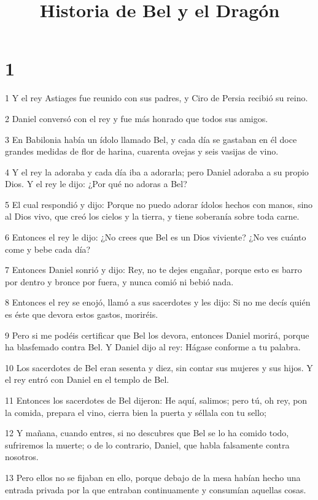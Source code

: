 

\title{Historia de Bel y el Dragón}

\chapter{1}

\par 1 Y el rey Astiages fue reunido con sus padres, y Ciro de Persia recibió su reino.
\par 2 Daniel conversó con el rey y fue más honrado que todos sus amigos.
\par 3 En Babilonia había un ídolo llamado Bel, y cada día se gastaban en él doce grandes medidas de flor de harina, cuarenta ovejas y seis vasijas de vino.
\par 4 Y el rey la adoraba y cada día iba a adorarla; pero Daniel adoraba a su propio Dios. Y el rey le dijo: ¿Por qué no adoras a Bel?
\par 5 El cual respondió y dijo: Porque no puedo adorar ídolos hechos con manos, sino al Dios vivo, que creó los cielos y la tierra, y tiene soberanía sobre toda carne.
\par 6 Entonces el rey le dijo: ¿No crees que Bel es un Dios viviente? ¿No ves cuánto come y bebe cada día?
\par 7 Entonces Daniel sonrió y dijo: Rey, no te dejes engañar, porque esto es barro por dentro y bronce por fuera, y nunca comió ni bebió nada.
\par 8 Entonces el rey se enojó, llamó a sus sacerdotes y les dijo: Si no me decís quién es éste que devora estos gastos, moriréis.
\par 9 Pero si me podéis certificar que Bel los devora, entonces Daniel morirá, porque ha blasfemado contra Bel. Y Daniel dijo al rey: Hágase conforme a tu palabra.
\par 10 Los sacerdotes de Bel eran sesenta y diez, sin contar sus mujeres y sus hijos. Y el rey entró con Daniel en el templo de Bel.
\par 11 Entonces los sacerdotes de Bel dijeron: He aquí, salimos; pero tú, oh rey, pon la comida, prepara el vino, cierra bien la puerta y séllala con tu sello;
\par 12 Y mañana, cuando entres, si no descubres que Bel se lo ha comido todo, sufriremos la muerte; o de lo contrario, Daniel, que habla falsamente contra nosotros.
\par 13 Pero ellos no se fijaban en ello, porque debajo de la mesa habían hecho una entrada privada por la que entraban continuamente y consumían aquellas cosas.
